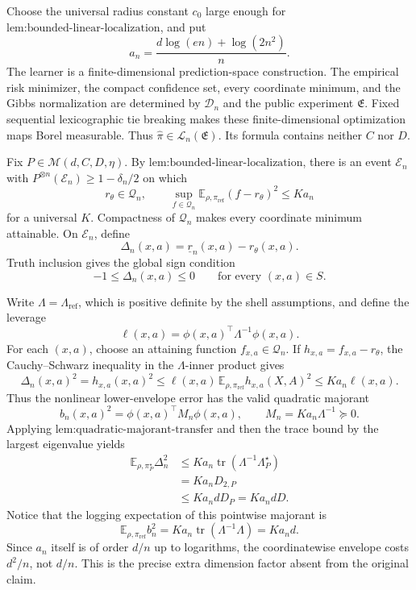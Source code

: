 Choose the universal radius constant \(c_0\) large enough for \(\text{lem:bounded-linear-localization}\), and put
\[
a_n=\frac{d\log(en)+\log(2n^2)}{n}.
\]
The learner is a finite-dimensional prediction-space construction. The empirical risk minimizer, the compact confidence set, every coordinate minimum, and the Gibbs normalization are determined by \(\mathcal D_n\) and the public experiment \(\mathfrak E\). Fixed sequential lexicographic tie breaking makes these finite-dimensional optimization maps Borel measurable. Thus \(\widehat\pi\in\mathcal L_n(\mathfrak E)\). Its formula contains neither \(C\) nor \(D\).

Fix \(P\in\mathcal M(d,C,D,\eta)\). By \(\text{lem:bounded-linear-localization}\), there is an event \(\mathcal E_n\) with \(P^{\otimes n}(\mathcal E_n)\ge1-\delta_n/2\) on which
\[
r_\theta\in\mathcal Q_n,
\qquad
\sup_{f\in\mathcal Q_n}\mathbb E_{\rho,\pi_{\mathrm{ref}}}(f-r_\theta)^2\le K a_n
\]
for a universal \(K\). Compactness of \(\mathcal Q_n\) makes every coordinate minimum attainable. On \(\mathcal E_n\), define
\[
\Delta_n(x,a)=\underline r_n(x,a)-r_\theta(x,a).
\]
Truth inclusion gives the global sign condition
\[
-1\le\Delta_n(x,a)\le0
\qquad\text{for every }(x,a)\in S.
\]

Write \(\Lambda=\Lambda_{\mathrm{ref}}\), which is positive definite by the shell assumptions, and define the leverage
\[
\ell(x,a)=\phi(x,a)^\top\Lambda^{-1}\phi(x,a).
\]
For each \((x,a)\), choose an attaining function \(f_{x,a}\in\mathcal Q_n\). If \(h_{x,a}=f_{x,a}-r_\theta\), the Cauchy--Schwarz inequality in the \(\Lambda\)-inner product gives
\[
\Delta_n(x,a)^2=h_{x,a}(x,a)^2
\le \ell(x,a)\,\mathbb E_{\rho,\pi_{\mathrm{ref}}}h_{x,a}(X,A)^2
\le K a_n\ell(x,a).
\]
Thus the nonlinear lower-envelope error has the valid quadratic majorant
\[
b_n(x,a)^2=\phi(x,a)^\top M_n\phi(x,a),
\qquad
M_n=K a_n\Lambda^{-1}\succeq0.
\]
Applying \(\text{lem:quadratic-majorant-transfer}\) and then the trace bound by the largest eigenvalue yields
\[
\begin{aligned}
\mathbb E_{\rho,\pi_P^\star}\Delta_n^2
&\le K a_n\operatorname{tr}(\Lambda^{-1}\Lambda_P^\star)\\
&=K a_n D_{2,P}\\
&\le K a_n dD_P
=K a_n dD.
\end{aligned}
\]
Notice that the logging expectation of this pointwise majorant is
\[
\mathbb E_{\rho,\pi_{\mathrm{ref}}}b_n^2
=K a_n\operatorname{tr}(\Lambda^{-1}\Lambda)=K a_n d.
\]
Since \(a_n\) itself is of order \(d/n\) up to logarithms, the coordinatewise envelope costs \(d^2/n\), not \(d/n\). This is the precise extra dimension factor absent from the original claim.

